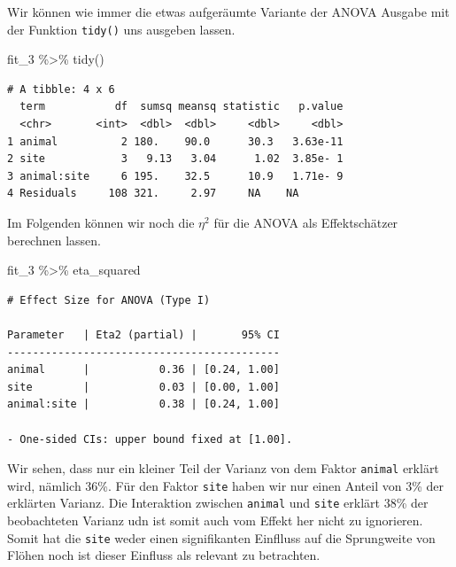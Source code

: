 \documentclass[
  letterpaper,
]{scrbook}
\newenvironment{Shaded}{\begin{snugshade}}{\end{snugshade}}
\newcommand{\FunctionTok}[1]{\textcolor[rgb]{0.28,0.35,0.67}{#1}}
\newcommand{\NormalTok}[1]{\textcolor[rgb]{0.00,0.23,0.31}{#1}}
\newcommand{\SpecialCharTok}[1]{\textcolor[rgb]{0.37,0.37,0.37}{#1}}
\begin{document}
{}

Wir können wie immer die etwas aufgeräumte Variante der ANOVA Ausgabe
mit der Funktion \texttt{tidy()} uns ausgeben lassen.

\begin{Shaded}
\begin{Highlighting}[]
\NormalTok{fit\_3 }\SpecialCharTok{\%\textgreater{}\%} \FunctionTok{tidy}\NormalTok{()}
\end{Highlighting}
\end{Shaded}

\begin{verbatim}
# A tibble: 4 x 6
  term           df  sumsq meansq statistic   p.value
  <chr>       <int>  <dbl>  <dbl>     <dbl>     <dbl>
1 animal          2 180.    90.0      30.3   3.63e-11
2 site            3   9.13   3.04      1.02  3.85e- 1
3 animal:site     6 195.    32.5      10.9   1.71e- 9
4 Residuals     108 321.     2.97     NA    NA       
\end{verbatim}

Im Folgenden können wir noch die \(\eta^2\) für die ANOVA als
Effektschätzer berechnen lassen.

\begin{Shaded}
\begin{Highlighting}[]
\NormalTok{fit\_3 }\SpecialCharTok{\%\textgreater{}\%}\NormalTok{ eta\_squared}
\end{Highlighting}
\end{Shaded}

\begin{verbatim}
# Effect Size for ANOVA (Type I)

Parameter   | Eta2 (partial) |       95% CI
-------------------------------------------
animal      |           0.36 | [0.24, 1.00]
site        |           0.03 | [0.00, 1.00]
animal:site |           0.38 | [0.24, 1.00]

- One-sided CIs: upper bound fixed at [1.00].
\end{verbatim}

Wir sehen, dass nur ein kleiner Teil der Varianz von dem Faktor
\texttt{animal} erklärt wird, nämlich 36\%. Für den Faktor \texttt{site}
haben wir nur einen Anteil von 3\% der erklärten Varianz. Die
Interaktion zwischen \texttt{animal} und \texttt{site} erklärt 38\% der
beobachteten Varianz udn ist somit auch vom Effekt her nicht zu
ignorieren. Somit hat die \texttt{site} weder einen signifikanten
Einflluss auf die Sprungweite von Flöhen noch ist dieser Einfluss als
relevant zu betrachten.
\end{document}
